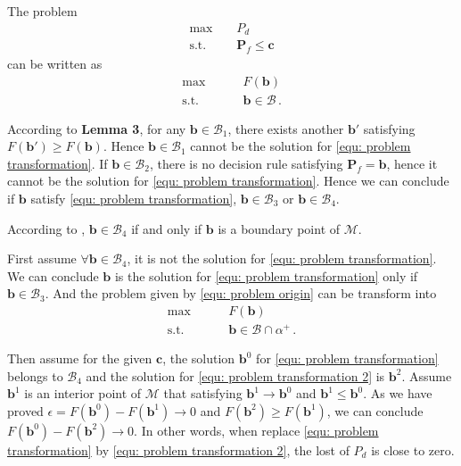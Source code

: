 \documentclass[12pt,journal,a4paper,twoside,onecolumn]{IEEEtran}
\begin{document}
\begin{spacing}{2.5}
The problem 
\begin{equation}
\begin{split}
\label{equ: problem origin}
\max\;\;\;\;&P_d\\
\text{s.t.}\;\;\;\;&\mathbf{P}_f \leq \mathbf{c}
\end{split}
\end{equation}
can be written as
\begin{equation}
\label{equ: problem transformation}
\begin{split}
\max\;\;\;\;\;\;\;\;&F(\mathbf{b})\\
\text{s.t.}\;\;\;\;\;\;\;\;& \mathbf{b} \in \mathcal{B}\,.
\end{split}
\end{equation}

According to \textbf{Lemma 3}, for any $\mathbf{b} \in \mathcal{B}_1$, there exists another $\mathbf{b}'$ satisfying $F(\mathbf{b}') \geq F(\mathbf{b})$. 
Hence $\mathbf{b} \in \mathcal{B}_1$ cannot be the solution for \eqref{equ: problem transformation}. If $\mathbf{b} \in \mathcal{B}_2$, there is no decision rule satisfying $\mathbf{P}_{f} = \mathbf{b}$, hence it cannot be the solution for \eqref{equ: problem transformation}. 
Hence we can conclude if $\mathbf{b}$ satisfy \eqref{equ: problem transformation}, $\mathbf{b} \in \mathcal{B}_3$ or $\mathbf{b} \in \mathcal{B}_4$. 

According to \cite{dantzig1951fundamental}, $\mathbf{b} \in \mathcal{B}_4$ if and only if $\mathbf{b}$ is a boundary point of $\mathcal{M}$. 

First assume $\forall \mathbf{b} \in \mathcal{B}_4$, it is not the solution for \eqref{equ: problem transformation}. We can conclude $\mathbf{b}$ is the solution for \eqref{equ: problem transformation} only if $\mathbf{b} \in \mathcal{B}_3$. And the 
problem given by \eqref{equ: problem origin} can be transform into
\begin{equation}
\label{equ: problem transformation 2}
\begin{split}
\max\;\;\;\;\;\;\;\;&F(\mathbf{b})\\
\text{s.t.}\;\;\;\;\;\;\;\;& \mathbf{b} \in \mathcal{B} \cap \alpha^+ \,.
\end{split}
\end{equation}

Then assume for the given $\mathbf{c}$, the solution $\mathbf{b}^0$ for \eqref{equ: problem transformation} belongs to $\mathcal{B}_4$ and the solution for \eqref{equ: problem transformation 2} is $\mathbf{b}^2$. Assume $\mathbf{b}^1$ is an interior point of $\mathcal{M}$ that satisfying $\mathbf{b}^1 \rightarrow \mathbf{b}^0$ and $\mathbf{b}^1 \leq \mathbf{b}^0$. 
As we have proved $\epsilon = F(\mathbf{b}^0) - F(\mathbf{b}^1) \rightarrow 0$ and  $F(\mathbf{b}^2) \geq F(\mathbf{b}^1)$, we can conclude  $F(\mathbf{b}^0) - F(\mathbf{b}^2) \rightarrow 0$.
In other words, when replace \eqref{equ: problem transformation} by \eqref{equ: problem transformation 2}, the lost of $P_d$ is close to zero. 


\end{spacing}
\end{document}
